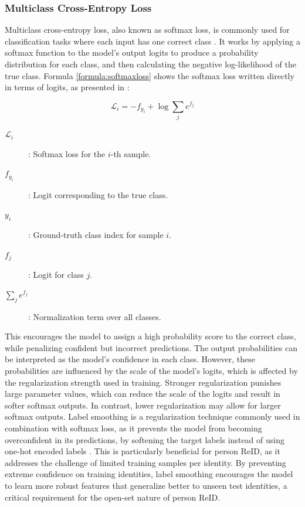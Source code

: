 \subsubsection*{Multiclass Cross-Entropy Loss}
Multiclass cross-entropy loss, also known as softmax loss, is commonly used for classification tasks where each input has one correct class \cite{softmax}. It works by applying a softmax function to the model's output logits to produce a probability distribution for each class, and then calculating the negative log-likelihood of the true class. Formula \ref{formula:softmaxloss} shows the softmax loss written directly in terms of logits, as presented in \cite{softmax}:

\begin{equation}
\mathcal{L}_i = - f_{y_i} + \log \sum_{j} e^{f_j}
\label{formula:softmaxloss}
\end{equation}

\begin{description}
    \item[$\mathcal{L}_i$]: Softmax loss for the $i$-th sample.
    \item[$f_{y_i}$]: Logit corresponding to the true class.
    \item[$y_i$]: Ground-truth class index for sample $i$.
    \item[$f_j$]: Logit for class $j$.
    \item[$\sum_j e^{f_j}$]: Normalization term over all classes.
\end{description}

\noindent This encourages the model to assign a high probability score to the correct class, while penalizing confident but incorrect predictions. The output probabilities can be interpreted as the model's confidence in each class. However, these probabilities are influenced by the scale of the model's logits, which is affected by the regularization strength used in training. Stronger regularization punishes large parameter values, which can reduce the scale of the logits and result in softer softmax outputs. In contrast, lower regularization may allow for larger softmax outputs. Label smoothing is a regularization technique commonly used in combination with softmax loss, as it prevents the model from becoming overconfident in its predictions, by softening the target labels instead of using one-hot encoded labels \cite{labelsmoothing}. This is particularly beneficial for person \acs{ReID}, as it addresses the challenge of limited training samples per identity. By preventing extreme confidence on training identities, label smoothing encourages the model to learn more robust features that generalize better to unseen test identities, a critical requirement for the open-set nature of person \acs{ReID}.

